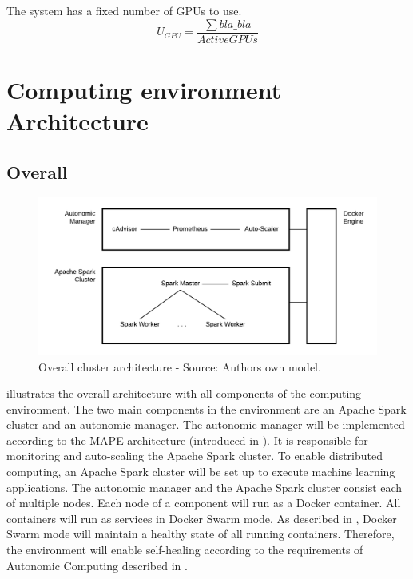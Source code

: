 The system has a fixed number of GPUs to use.
\begin{equation}
U_{GPU} = \dfrac{\sum bla\_bla}{ActiveGPUs}
\label{eq:formel}
\end{equation}


\section{Computing environment Architecture}


\subsection{Overall}
\label{subsec:05_arch_overall}

\begin{figure}[h]
\centering
\includegraphics[scale=0.8]{images/05_conceptual_design/cluster_architecture/overall_architecture}
\caption{Overall cluster architecture - Source: Authors own model.}
\label{fig:ca-overall_architecture}
\end{figure}

 illustrates the overall architecture with all components of the computing environment. The two main components in the environment are an Apache Spark cluster and an autonomic manager.
The autonomic manager will be implemented according to the MAPE architecture (introduced in ). It is responsible for monitoring and auto-scaling the Apache Spark cluster. To enable distributed computing, an Apache Spark cluster will be set up to execute machine learning applications. 
The autonomic manager and the Apache Spark cluster consist each of multiple nodes. Each node of a component will run as a Docker container.
All containers will run as services in Docker Swarm mode. As described in , Docker Swarm mode will maintain a healthy state of all running containers. Therefore, the environment will enable self-healing according to the requirements of Autonomic Computing described in .


